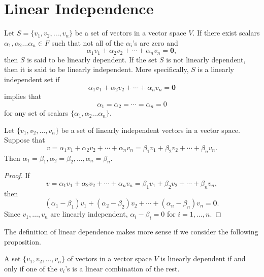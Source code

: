  
\section{Linear Independence}
 

Let $S = \{v_1, v_2, \ldots, v_n\}$ be a set of vectors in a vector
space $V$. If there exist scalars $\alpha_1, \alpha_2 \ldots \alpha_n
\in F$ such that not all of the $\alpha_i$'s are zero and 
\[
\alpha_1 v_1 + \alpha_2 v_2 + \cdots + \alpha_n v_n = {\mathbf 0 },
\]
then $S$ is said to be {\bfi linearly
dependent}. If the set $S$ is not linearly
dependent, then it is said to be {\bfi linearly
independent}. More specifically, $S$ is a
linearly independent set if
\[ 
\alpha_1 v_1 + \alpha_2 v_2 + \cdots + \alpha_n v_n = {\mathbf 0 }
\]
implies that
\[
\alpha_1 = \alpha_2 = \cdots = \alpha_n = 0
\]
for any set of scalars $\{ \alpha_1, \alpha_2 \ldots \alpha_n \}$.


 
\begin{proposition}
Let $\{ v_1, v_2, \ldots, v_n \}$ be a set of linearly independent
vectors in a vector space. Suppose that 
\[
v = \alpha_1 v_1 + \alpha_2 v_2 + \cdots + \alpha_n v_n
= \beta_1 v_1 + \beta_2 v_2 + \cdots + \beta_n v_n.
\]
Then $\alpha_1 = \beta_1, \alpha_2 = \beta_2, \ldots, \alpha_n =
\beta_n$. 
\end{proposition}

\begin{proof}
If 
\[
v = \alpha_1 v_1 + \alpha_2 v_2 + \cdots + \alpha_n v_n
= \beta_1 v_1 + \beta_2 v_2 + \cdots + \beta_n v_n,
\]
then
\[
(\alpha_1 - \beta_1) v_1 + (\alpha_2 - \beta_2) v_2 + \cdots +
(\alpha_n - \beta_n) v_n = {\mathbf 0}.
\]
Since $v_1, \ldots, v_n$ are linearly independent, $\alpha_i - \beta_i
=0$ for $i = 1, \ldots, n$.
\end{proof}
 

\medskip


The definition of linear dependence makes more sense if we consider
the following proposition.

 
\begin{proposition}
A set $\{ v_1, v_2, \dots, v_n \}$ of vectors in a vector space $V$ is
linearly dependent if and only if one of the $v_i$'s is a linear
combination of the rest. 
\end{proposition}


